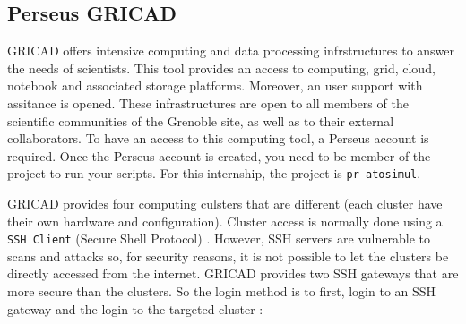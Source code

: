     \subsection{Perseus GRICAD}

        GRICAD offers intensive computing and data processing infrstructures to answer the needs of scientists. This tool provides an access to computing, grid, cloud, notebook and associated storage platforms. Moreover, an user support with assitance is opened. These infrastructures are open to all members of the scientific communities of the Grenoble site, as well as to their external collaborators. To have an access to this computing tool, a Perseus account is required. Once the Perseus account is created, you need to be member of the project to run your scripts. For this internship, the project is \verb|pr-atosimul|. \medskip

        GRICAD provides four computing culsters that are different (each cluster have their own hardware and configuration). Cluster access is normally done using a \verb|SSH Client| (Secure Shell Protocol) \cite{1}. However, \gls{SSH} servers are vulnerable to scans and attacks so, for security reasons, it is not possible to let the clusters be directly accessed from the internet. GRICAD provides two \gls{SSH} gateways that are more secure than the clusters. So the login method is to first, login to an \gls{SSH} gateway and the login to the targeted cluster : 

        \begin{center}
            \captionsetup{type=figure}
        \end{center}
        
